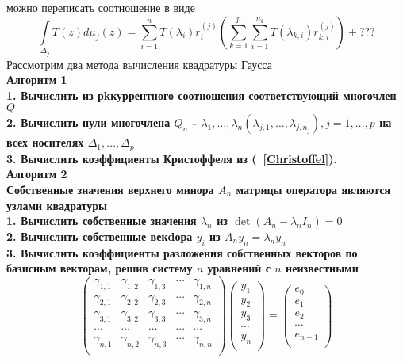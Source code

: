 можно переписать соотношение в виде
\begin{equation}
\label{Quad} \int \limits_{\Delta_j} T(z) d\mu_j(z) =
\sum\limits_{i=1}^{n} {T(\lambda_{i})r_{i}^{(j)}}
 \left( \sum\limits_{k=1}^{p}
\sum\limits_{i=1}^{n_k} {T(\lambda_{k,i})r_{k,i}^{(j)}}\right)+???
\end{equation}
Рассмотрим два метода вычисления квадратуры Гаусса \\
\bf Алгоритм 1 \rm \\
1. Вычислить из рkкуррентного соотношения соответствующий
многочлен $Q$ \\
2. Вычислить нули многочлена $Q_n$ -
$\lambda_{1},\ldots,\lambda_{n}(\lambda_{j,1},\ldots,\lambda_{j,n_j}),j=1,\ldots,p$
на всех
носителях $\Delta_1,\ldots,\Delta_p$ \\
3. Вычислить коэффициенты Кристоффеля из (~\ref{Christoffel}).\\
\bf Алгоритм 2 \rm \\
Собственные значения верхнего минора $A_n$ матрицы оператора
являются узлами квадратуры \\
1. Вычислить собственные значения $\lambda_n$ из
$\det(A_n-\lambda_nI_n) =0$ \\
2. Вычислить собственные векdора $y_i$ из $A_ny_n=\lambda_ny_n$ \\
3. Вычислить коэффициенты разложения собственных векторов по
базисным векторам, решив систему $n$ уравнений с $n$ неизвестными
\begin{equation}
\left(
\begin{array} {cccccc}
\gamma_{1,1} & \gamma_{1,2} & \gamma_{1,3} & \cdots & \gamma_{1,n} \\
\gamma_{2,1} & \gamma_{2,2} & \gamma_{2,3} & \cdots & \gamma_{2,n} \\
\gamma_{3,1} & \gamma_{3,2} & \gamma_{3,3} & \cdots & \gamma_{3,n} \\
\cdots & \cdots & \cdots & \cdots & \cdots \\
\gamma_{n,1} & \gamma_{n,2} & \gamma_{n,3} & \cdots & \gamma_{n,n} \\
\end{array}
\right) \left(
\begin{array} {cccccc}
y_1 \\
y_2 \\
y_3 \\
\cdots \\
y_n \\
\end{array}
\right)= \left(
\begin{array}{cccccc}
e_0 \\
e_1 \\
e_2 \\
\cdots \\
e_{n-1} \\
\end{array}
\right)
\end{equation}
